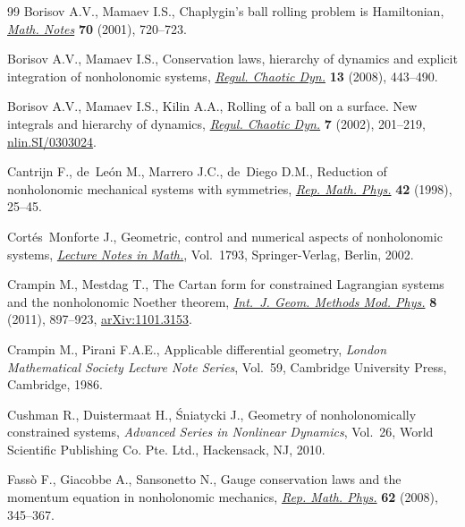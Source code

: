 \documentclass[pdftex]{sigma}
\numberwithin{equation}{section}
\begin{document}
\begin{thebibliography}{99}
Borisov A.V., Mamaev I.S., Chaplygin's ball rolling problem is {H}amiltonian,
  \href{http://dx.doi.org/10.1023/A:1012995330780}{\textit{Math. Notes}} \textbf{70} (2001), 720--723.

Borisov A.V., Mamaev I.S., Conservation laws, hierarchy of dynamics and
  explicit integration of nonholonomic systems, \href{http://dx.doi.org/10.1134/S1560354708050079}{\textit{Regul. Chaotic Dyn.}}
  \textbf{13} (2008), 443--490.

Borisov A.V., Mamaev I.S., Kilin A.A., Rolling of a ball on a surface. {N}ew
  integrals and hierarchy of dynamics, \href{http://dx.doi.org/10.1070/RD2002v007n02ABEH000205}{\textit{Regul. Chaotic Dyn.}} \textbf{7}
  (2002), 201--219, \href{http://arxiv.org/abs/nlin.SI/0303024}{nlin.SI/0303024}.

Cantrijn F., de~Le{\'o}n M., Marrero J.C., de~Diego D.M., Reduction of
  nonholonomic mechanical systems with symmetries, \href{http://dx.doi.org/10.1016/S0034-4877(98)80003-7}{\textit{Rep. Math. Phys.}}
  \textbf{42} (1998), 25--45.

Cort{\'e}s~Monforte J., Geometric, control and numerical aspects of
  nonholonomic systems, \href{http://dx.doi.org/10.1007/b84020}{\textit{Lecture Notes in Math.}}, Vol.~1793,
  Springer-Verlag, Berlin, 2002.

Crampin M., Mestdag T., The {C}artan form for constrained {L}agrangian systems
  and the nonholonomic {N}oether theorem, \href{http://dx.doi.org/10.1142/S0219887811005452}{\textit{Int.~J. Geom. Methods Mod.
  Phys.}} \textbf{8} (2011), 897--923, \href{http://arxiv.org/abs/1101.3153}{arXiv:1101.3153}.

Crampin M., Pirani F.A.E., Applicable dif\/ferential geometry, \textit{London
  Mathematical Society Lecture Note Series}, Vol.~59, Cambridge University
  Press, Cambridge, 1986.

Cushman R., Duistermaat H., {\'S}niatycki J., Geometry of nonholonomically
  constrained systems, \textit{Advanced Series in Nonlinear Dynamics}, Vol.~26,
  World Scientif\/ic Publishing Co. Pte. Ltd., Hackensack, NJ, 2010.

Fass{\`o} F., Giacobbe A., Sansonetto N., Gauge conservation laws and the
  momentum equation in nonholonomic mechanics, \href{http://dx.doi.org/10.1016/S0034-4877(09)00005-6}{\textit{Rep. Math. Phys.}}
  \textbf{62} (2008), 345--367.


\end{thebibliography}
\end{document}
